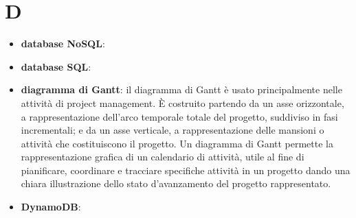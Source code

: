 \section{D}
\begin{itemize}
	\item \textbf{database NoSQL}:
	\item \textbf{database SQL}:
	\item \textbf{diagramma di Gantt}: il diagramma di Gantt è usato principalmente nelle attività di project management. \MakeUppercase{è} costruito partendo da un asse orizzontale, a rappresentazione dell'arco temporale totale del progetto, suddiviso in fasi incrementali; e da un asse verticale, a rappresentazione delle mansioni o attività che costituiscono il progetto. Un diagramma di Gantt permette la rappresentazione grafica di un calendario di attività, utile al fine di pianificare, coordinare e tracciare specifiche attività in un progetto dando una chiara illustrazione dello stato d'avanzamento del progetto rappresentato.
	\item \textbf{DynamoDB}:
\end{itemize}
